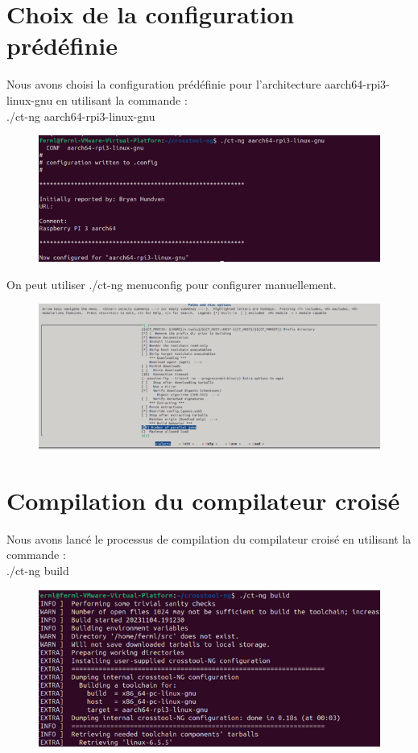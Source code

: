 \section{Choix de la configuration prédéfinie }
Nous avons choisi la configuration prédéfinie pour l'architecture aarch64-rpi3-linux-gnu en utilisant la commande :
\\ ./ct-ng aarch64-rpi3-linux-gnu 
\newpage
\begin{figure}[h]
    \includegraphics[width=1\textwidth]{images/13.png}   
\end{figure}
On peut utiliser ./ct-ng menuconfig pour configurer manuellement.  
\begin{figure}[h]
    \includegraphics[width=1\textwidth]{images/14.png}   
\end{figure}
\section{Compilation du compilateur croisé}
 Nous avons lancé le processus de compilation du compilateur croisé en utilisant la commande :
\\ ./ct-ng build
\begin{figure}[h]
    \includegraphics[width=1\textwidth]{images/15.png}   
\end{figure}

